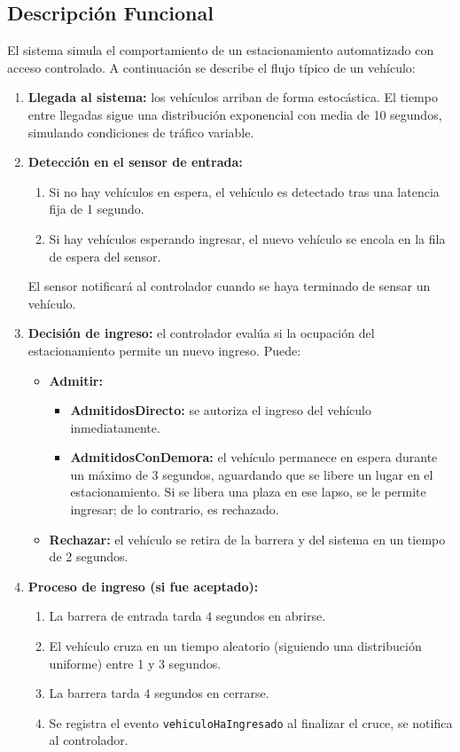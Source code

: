 \documentclass[12pt]{article}
\begin{document}
\subsection{Descripción Funcional}

El sistema simula el comportamiento de un estacionamiento automatizado con acceso controlado. A continuación se describe el flujo típico de un vehículo:
\begin{enumerate}
    \item \textbf{Llegada al sistema:} los vehículos arriban de forma estocástica. El tiempo entre llegadas sigue una distribución exponencial con media de 10 segundos, simulando condiciones de tráfico variable.
    
    \item \textbf{Detección en el sensor de entrada:}
    \begin{enumerate}
        \item Si no hay vehículos en espera, el vehículo es detectado tras una latencia fija de 1 segundo.
        \item Si hay vehículos esperando ingresar, el nuevo vehículo se encola en la fila de espera del sensor.
    \end{enumerate}
    El sensor notificará al controlador cuando se haya terminado de sensar un vehículo.

    \item \textbf{Decisión de ingreso:} el controlador evalúa si la ocupación del estacionamiento permite un nuevo ingreso. Puede:
    \begin{itemize}
    \item \textbf{Admitir:}
    \begin{itemize}[label=--]
        \item \textbf{AdmitidosDirecto:} se autoriza el ingreso del vehículo inmediatamente.
        \item \textbf{AdmitidosConDemora:} el vehículo permanece en espera durante un máximo de 3 segundos, aguardando que se libere un lugar en el estacionamiento. Si se libera una plaza en ese lapso, se le permite ingresar; de lo contrario, es rechazado.
    \end{itemize}
    \item \textbf{Rechazar:} el vehículo se retira de la barrera y del sistema en un tiempo de 2 segundos.
    \end{itemize}

    \item \textbf{Proceso de ingreso (si fue aceptado):}
    \begin{enumerate}
        \item La barrera de entrada tarda 4 segundos en abrirse.
        \item El vehículo cruza en un tiempo aleatorio (siguiendo una distribución uniforme) entre 1 y 3 segundos.
        \item La barrera tarda 4 segundos en cerrarse.
        \item Se registra el evento \texttt{vehiculoHaIngresado} al finalizar el cruce, se notifica al controlador.
    \end{enumerate}


\end{enumerate}
\end{document}
